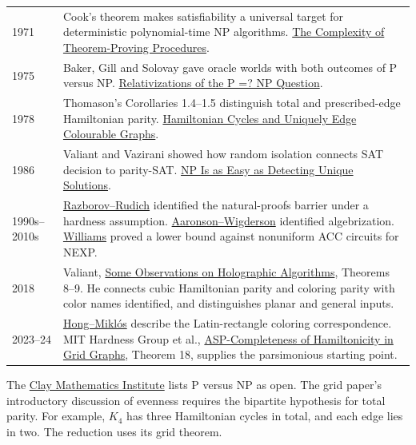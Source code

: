 \documentclass[11pt,letterpaper]{article}
\newcommand{\hd}[1]{\par\medskip{\large\bfseries\color{pine}#1}\par\nobreak}
\newcommand{\citepaper}[2]{\href{#1}{#2}}
\begin{document}
\hd{Historical landmarks and primary reading}
{\small
\begin{tabular}{@{}p{.11\linewidth}p{.84\linewidth}@{}}
\toprule
1971 & Cook's theorem makes satisfiability a universal target for deterministic polynomial-time NP algorithms. \citepaper{https://doi.org/10.1145/800157.805047}{The Complexity of Theorem-Proving Procedures}.\\[3pt]
1975 & Baker, Gill and Solovay gave oracle worlds with both outcomes of P versus NP. \citepaper{https://doi.org/10.1137/0204037}{Relativizations of the P =? NP Question}.\\[3pt]
1978 & Thomason's Corollaries 1.4--1.5 distinguish total and prescribed-edge Hamiltonian parity. \citepaper{https://www.dpmms.cam.ac.uk/~agt2/HC.pdf}{Hamiltonian Cycles and Uniquely Edge Colourable Graphs}.\\[3pt]
1986 & Valiant and Vazirani showed how random isolation connects SAT decision to parity-SAT. \citepaper{https://doi.org/10.1016/0304-3975(86)90135-0}{NP Is as Easy as Detecting Unique Solutions}.\\[3pt]
1990s--2010s & \citepaper{https://doi.org/10.1006/jcss.1997.1494}{Razborov--Rudich} identified the natural-proofs barrier under a hardness assumption. \citepaper{https://www.scottaaronson.com/papers/alg.pdf}{Aaronson--Wigderson} identified algebrization. \citepaper{https://people.csail.mit.edu/rrw/acc-lbs.pdf}{Williams} proved a lower bound against nonuniform ACC circuits for NEXP.\\[3pt]
2018 & Valiant, \citepaper{https://people.seas.harvard.edu/~valiant/observations-8-1-17.pdf}{Some Observations on Holographic Algorithms}, Theorems 8--9. He connects cubic Hamiltonian parity and coloring parity with color names identified, and distinguishes planar and general inputs.\\[3pt]
2023--24 & \citepaper{https://real.mtak.hu/191308/}{Hong--Mikl\'os} describe the Latin-rectangle coloring correspondence. MIT Hardness Group et al., \citepaper{https://doi.org/10.4230/LIPIcs.FUN.2024.23}{ASP-Completeness of Hamiltonicity in Grid Graphs}, Theorem 18, supplies the parsimonious starting point.\\
\bottomrule
\end{tabular}}
\smallskip
{\footnotesize The \citepaper{https://www.claymath.org/millennium/p-vs-np/}{Clay Mathematics Institute} lists P versus NP as open. The grid paper's introductory discussion of evenness requires the bipartite hypothesis for total parity. For example, $K_4$ has three Hamiltonian cycles in total, and each edge lies in two. The reduction uses its grid theorem.\par}
\end{document}
